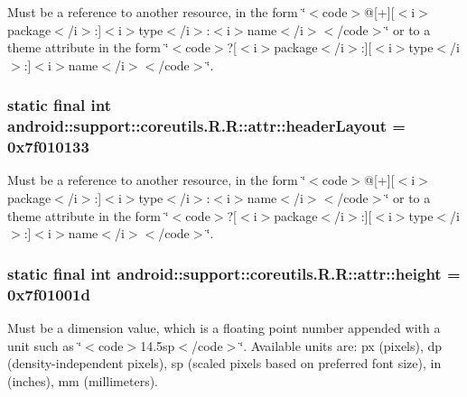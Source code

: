 Must be a reference to another resource, in the form \char`\"{}$<$code$>$@\mbox{[}+\mbox{]}\mbox{[}$<$i$>$package$<$/i$>$:\mbox{]}$<$i$>$type$<$/i$>$:$<$i$>$name$<$/i$>$$<$/code$>$\char`\"{} or to a theme attribute in the form \char`\"{}$<$code$>$?\mbox{[}$<$i$>$package$<$/i$>$:\mbox{]}\mbox{[}$<$i$>$type$<$/i$>$:\mbox{]}$<$i$>$name$<$/i$>$$<$/code$>$\char`\"{}. \hypertarget{classandroid_1_1support_1_1coreutils_1_1_r_1_1attr_6b7b94d4882de6db97ac508fbdb88000}{
\subsubsection[{headerLayout}]{\setlength{\rightskip}{0pt plus 5cm}static final int android::support::coreutils.R.R::attr::headerLayout = 0x7f010133}}
\label{classandroid_1_1support_1_1coreutils_1_1_r_1_1attr_6b7b94d4882de6db97ac508fbdb88000}


Must be a reference to another resource, in the form \char`\"{}$<$code$>$@\mbox{[}+\mbox{]}\mbox{[}$<$i$>$package$<$/i$>$:\mbox{]}$<$i$>$type$<$/i$>$:$<$i$>$name$<$/i$>$$<$/code$>$\char`\"{} or to a theme attribute in the form \char`\"{}$<$code$>$?\mbox{[}$<$i$>$package$<$/i$>$:\mbox{]}\mbox{[}$<$i$>$type$<$/i$>$:\mbox{]}$<$i$>$name$<$/i$>$$<$/code$>$\char`\"{}. \hypertarget{classandroid_1_1support_1_1coreutils_1_1_r_1_1attr_b14cb74f24ea74f53c00b4eae40e614b}{
\subsubsection[{height}]{\setlength{\rightskip}{0pt plus 5cm}static final int android::support::coreutils.R.R::attr::height = 0x7f01001d}}
\label{classandroid_1_1support_1_1coreutils_1_1_r_1_1attr_b14cb74f24ea74f53c00b4eae40e614b}


Must be a dimension value, which is a floating point number appended with a unit such as \char`\"{}$<$code$>$14.5sp$<$/code$>$\char`\"{}. Available units are: px (pixels), dp (density-independent pixels), sp (scaled pixels based on preferred font size), in (inches), mm (millimeters). 

